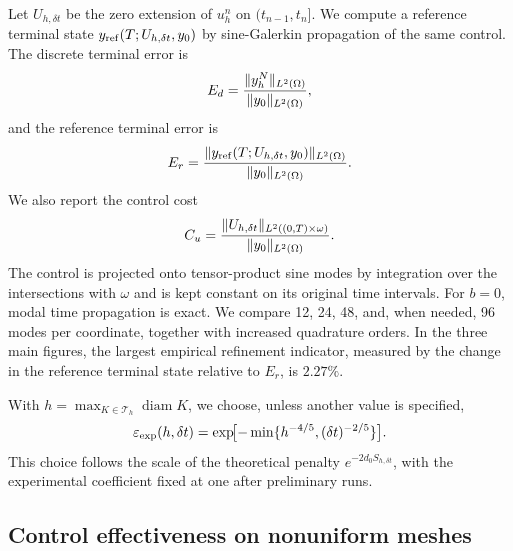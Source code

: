 \documentclass[print,wide,eng]{draft}
\begin{document}
Let $U_{h,\delta t}$ be the zero extension of $u_h^n$ on $(t_{n-1},t_n]$. We compute a reference terminal state $y_{\rm ref}(T;U_{h,\delta t},y_0)$ by sine-Galerkin propagation of the same control. The discrete terminal error is\vspace{-2mm}
%
$$
E_d=\frac{\|y_h^N\|_{L^2(\Omega)}}{\|y_0\|_{L^2(\Omega)}},\vspace{-2mm}
$$
%
and the reference terminal error is\vspace{-3mm}
%
$$
E_r=\frac{\|y_{\rm ref}(T;U_{h,\delta t},y_0)\|_{L^2(\Omega)}}{\|y_0\|_{L^2(\Omega)}}.\vspace{-2mm}
$$
%
We also report the control cost\vspace{-3mm}
%
$$
C_u =\frac{\|U_{h,\delta t}\|_{L^2((0,T)\times\omega)}}{\|y_0\|_{L^2(\Omega)}}.\vspace{-2mm}
$$
%
The control is projected onto tensor-product sine modes by integration over the intersections with $\omega$ and is kept constant on its original time intervals. For $b=0$, modal time propagation is exact. We compare 12, 24, 48, and, when needed, 96 modes per coordinate, together with increased quadrature orders. In the three main figures, the largest empirical refinement indicator, measured by the change in the reference terminal state relative to $E_r$, is $2.27\%$.

With $h=\max_{K\in\mathcal T_h}\operatorname{diam}K$, we choose, unless another value is specified, \vspace{-2mm}
%
\begin{equation}\label{eq:num-penalty}
\varepsilon_{\exp}(h,\delta t)
=\exp\!\bigl[-\min\{h^{-4/5},(\delta t)^{-2/5}\}\bigr].\vspace{-2mm}
\end{equation}
%
This choice follows the scale of the theoretical penalty $e^{-2d_0S_{h,\delta t}}$, with the experimental coefficient fixed at one after preliminary runs.

\subsection{Control effectiveness on nonuniform meshes}
\end{document}
